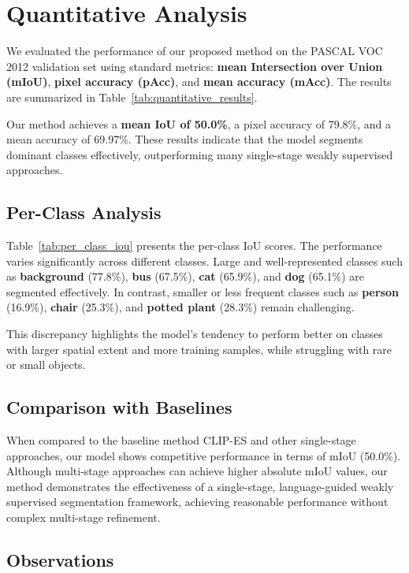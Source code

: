 
\section{Quantitative Analysis}
\label{sec:quantitative_analysis}

We evaluated the performance of our proposed method on the PASCAL VOC 2012 validation set using standard metrics: \textbf{mean Intersection over Union (mIoU)}, \textbf{pixel accuracy (pAcc)}, and \textbf{mean accuracy (mAcc)}. The results are summarized in Table~\ref{tab:quantitative_results}. 

Our method achieves a \textbf{mean IoU of 50.0\%}, a pixel accuracy of 79.8\%, and a mean accuracy of 69.97\%. These results indicate that the model segments dominant classes effectively, outperforming many single-stage weakly supervised approaches.

\subsection{Per-Class Analysis}

Table~\ref{tab:per_class_iou} presents the per-class IoU scores. The performance varies significantly across different classes. Large and well-represented classes such as \textbf{background} (77.8\%), \textbf{bus} (67.5\%), \textbf{cat} (65.9\%), and \textbf{dog} (65.1\%) are segmented effectively. In contrast, smaller or less frequent classes such as \textbf{person} (16.9\%), \textbf{chair} (25.3\%), and \textbf{potted plant} (28.3\%) remain challenging.

This discrepancy highlights the model's tendency to perform better on classes with larger spatial extent and more training samples, while struggling with rare or small objects.

\subsection{Comparison with Baselines}

When compared to the baseline method CLIP-ES \cite{wsss_clip_es} and other single-stage approaches, our model shows competitive performance in terms of mIoU (50.0\%). Although multi-stage approaches can achieve higher absolute mIoU values, our method demonstrates the effectiveness of a single-stage, language-guided weakly supervised segmentation framework, achieving reasonable performance without complex multi-stage refinement.

\subsection{Observations}


